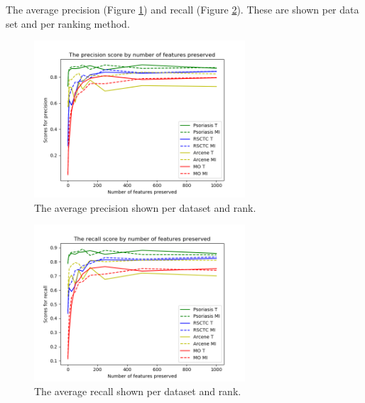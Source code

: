 \documentclass[10pt,a4paper]{article}
\begin{document}
	The average precision (Figure \ref{fig:DatasetRankPrecisionScores}) and recall (Figure \ref{fig:DatasetRankRecallScores}). These are shown per data set and per ranking method.
	
	\begin{figure}[H]
		\includegraphics[width=0.7\textwidth]{Data_Rank_Prec_Scores.png}
		\caption{The average precision shown per dataset and rank.}
		\label{fig:DatasetRankPrecisionScores}
	\end{figure}

	\begin{figure}[H]
		\includegraphics[width=0.7\textwidth]{Data_Rank_Rec_Scores.png}
		\caption{The average recall shown per dataset and rank.}
		\label{fig:DatasetRankRecallScores}
	\end{figure}
	
	
\end{document}
